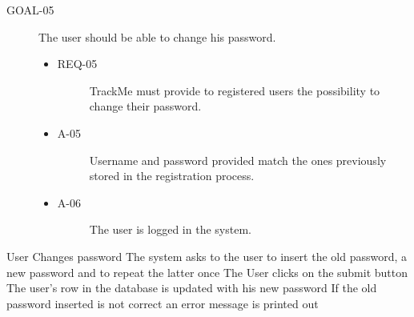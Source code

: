 \documentclass[a4paper]{article}
\newcommand{\requirement}{\ding{229}}%
\begin{document}
               \begin{description}
        	\item[GOAL-05] The user should be able to change his password.
            	\begin{itemize}
            	    \item[\requirement]
                	\begin{description}
                	\item[REQ-05] TrackMe must provide to registered users the possibility to change their password. 
                	\end{description}
                	\item
                	\begin{description}
                	\item[A-05] Username and password provided match the ones previously stored in the registration process.
                	\end{description}
                	\item
                	\begin{description}
                	\item[A-06] The user is logged in the system.
                	\end{description}
                	\end{itemize}
        \end{description}
       
       
       
       \begin{usecase}{User Changes password}
              {The system asks to the user to insert the old password, a new password and to repeat the latter once}
              {The User clicks on the submit button}
              {The user's row in the database is updated with his new password}
        {If the old password inserted is not correct an error message is printed out}
       \end{usecase}
       
\end{document}
